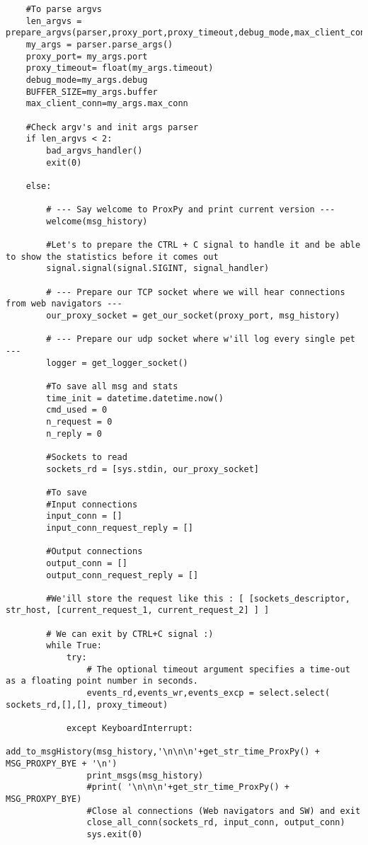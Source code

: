 \begin{verbatim}
    #To parse argvs 
    len_argvs = prepare_argvs(parser,proxy_port,proxy_timeout,debug_mode,max_client_conn,BUFFER_SIZE,list_filter_server,list_filter_client)
    my_args = parser.parse_args()
    proxy_port= my_args.port
    proxy_timeout= float(my_args.timeout)
    debug_mode=my_args.debug
    BUFFER_SIZE=my_args.buffer
    max_client_conn=my_args.max_conn

    #Check argv's and init args parser
    if len_argvs < 2:
	    bad_argvs_handler()
	    exit(0)
    
    else:

        # --- Say welcome to ProxPy and print current version ---
        welcome(msg_history)

        #Let's to prepare the CTRL + C signal to handle it and be able  to show the statistics before it comes out
        signal.signal(signal.SIGINT, signal_handler)

	    # --- Prepare our TCP socket where we will hear connections from web navigators ---
        our_proxy_socket = get_our_socket(proxy_port, msg_history)

        # --- Prepare our udp socket where w'ill log every single pet ---
        logger = get_logger_socket()

        #To save all msg and stats
        time_init = datetime.datetime.now()
        cmd_used = 0
        n_request = 0
        n_reply = 0

        #Sockets to read
        sockets_rd = [sys.stdin, our_proxy_socket]

        #To save 
        #Input connections
        input_conn = []
        input_conn_request_reply = []

        #Output connections 
        output_conn = []
        output_conn_request_reply = []
        
        #We'ill store the request like this : [ [sockets_descriptor, str_host, [current_request_1, current_request_2] ] ]

        # We can exit by CTRL+C signal :)
        while True:
            try:
	    		# The optional timeout argument specifies a time-out as a floating point number in seconds.
                events_rd,events_wr,events_excp = select.select( sockets_rd,[],[], proxy_timeout)

            except KeyboardInterrupt:
                add_to_msgHistory(msg_history,'\n\n\n'+get_str_time_ProxPy() + MSG_PROXPY_BYE + '\n')
                print_msgs(msg_history)
                #print( '\n\n\n'+get_str_time_ProxPy() + MSG_PROXPY_BYE)
                #Close al connections (Web navigators and SW) and exit
                close_all_conn(sockets_rd, input_conn, output_conn)
                sys.exit(0)


\end{verbatim}
